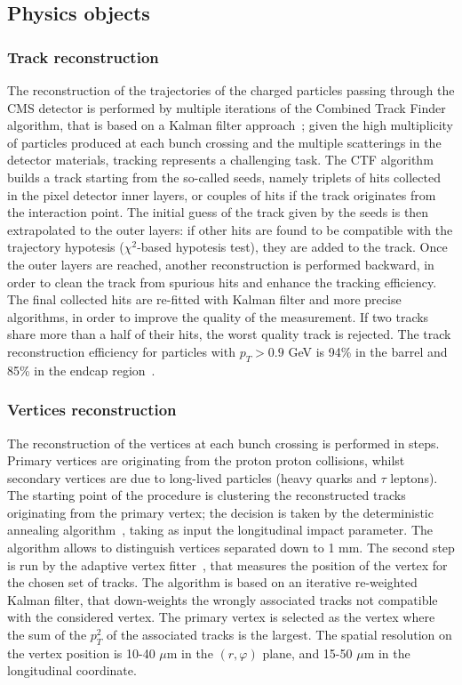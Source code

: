 \subsection{Physics objects}
\label{ssec:physicsobjects}

\subsubsection{Track reconstruction}
The reconstruction of the trajectories of the charged particles passing through the CMS detector is performed by multiple iterations of the Combined Track Finder algorithm, that is based on a Kalman filter approach~\cite{Fruhwirth:1987fm}; given the high multiplicity of particles produced at each bunch crossing and the multiple scatterings in the detector materials, tracking represents a challenging task. The CTF algorithm builds a track starting from the so-called seeds, namely triplets of hits collected in the pixel detector inner layers, or couples of hits if the track originates from the interaction point. The initial guess of the track given by the seeds is then extrapolated to the outer layers: if other hits are found to be compatible with the trajectory hypotesis ($\chi^2$-based hypotesis test), they are added to the track. Once the outer layers are reached, another reconstruction is performed backward, in order to clean the track from spurious hits and enhance the tracking efficiency. The final collected hits are re-fitted with Kalman filter and more precise algorithms, in order to improve the quality of the measurement. If two tracks share more than a half of their hits, the worst quality track is rejected. The track reconstruction efficiency for particles with $p_T >0.9$ GeV is 94\% in the barrel and 85\% in the endcap region~\cite{Chatrchyan:2014fea}.\\


\subsubsection{Vertices reconstruction}
The reconstruction of the vertices at each bunch crossing is performed in steps. Primary vertices are originating from the proton proton collisions, whilst secondary vertices are due to long-lived particles (heavy quarks and $\tau$ leptons). The starting point of the procedure is clustering the reconstructed tracks originating from the primary vertex; the decision is taken by the deterministic annealing algorithm~\cite{bib:detanneal}, taking as input the longitudinal impact parameter. The algorithm allows to distinguish vertices separated down to 1 mm. The second step is run by the adaptive vertex fitter~\cite{Fruhwirth:2007hz}, that measures the position of the vertex for the chosen set of tracks. The algorithm is based on an iterative re-weighted Kalman filter, that down-weights the wrongly associated tracks not compatible with the considered vertex. The primary vertex is selected as the vertex where the sum of the $p_T^2$ of the associated tracks is the largest. The spatial resolution on the vertex position is 10-40 $\mu$m in the $(r, \varphi)$ plane, and 15-50 $\mu$m in the longitudinal coordinate.


